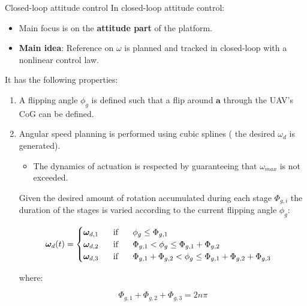 \documentclass{thesisbeamer}
\begin{document}
\begin{frame}[t,allowframebreaks]{Closed-loop attitude control}
In closed-loop attitude control:

\begin{itemize}
	\item Main focus is on the \textbf{attitude part} of the platform. 
	\item \textbf{Main idea}: Reference on $\omega$ is planned and tracked in closed-loop with a nonlinear control law.
\end{itemize}

It has the following properties:

\begin{enumerate}
	\item A flipping angle $\phi_g$ is defined such that a flip around $\bm{a}$ through the UAV's CoG can be defined.
	\item Angular speed planning is performed using cubic splines ( the desired $\omega_d$ is generated).
	\begin{itemize}
		\item The dynamics of actuation is respected by guaranteeing that $\omega_{max}$ is not exceeded.
	\end{itemize}		
	
	 
Given the desired amount of rotation accumulated during each stage $\Phi_{g,i}$ the duration
of the stages is varied according to the current flipping angle $\phi_g$:

\begin{equation}
	\bm{\omega}_d(t) = \begin{cases}
	\bm{\omega}_{d,1} \text{\hspace{0.5cm} if \hspace{0.5cm}} \phi_g \leq \Phi_{g,1} \\
	\bm{\omega}_{d,2} \text{\hspace{0.5cm} if \hspace{0.5cm}} \Phi_{g,1} < \phi_g \leq \Phi_{g,1} + \Phi_{g,2} \\
	\bm{\omega}_{d,3} \text{\hspace{0.5cm} if \hspace{0.5cm}} \Phi_{g,1} + \Phi_{g,2} < \phi_g \leq \Phi_{g,1} + \Phi_{g,2} + \Phi_{g,3} \\
	\end{cases} 
\end{equation}

where: 

\begin{equation}
	\Phi_{g,1} + \Phi_{g,2} + \Phi_{g,3} = 2 n \pi 
\end{equation}


\end{enumerate}
\end{frame}
\end{document}
